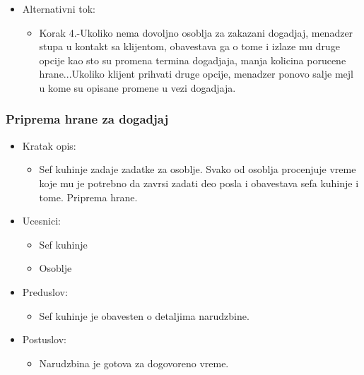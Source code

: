 \documentclass[a4paper]{article}
\begin{document}
      \begin{itemize}
        \item Alternativni tok:
          \begin{itemize}
        \item Korak 4.-Ukoliko nema dovoljno osoblja za zakazani dogadjaj, menadzer stupa u kontakt sa klijentom, obavestava ga o tome i izlaze mu druge opcije kao sto su promena termina dogadjaja, manja kolicina porucene hrane...Ukoliko klijent prihvati druge opcije, menadzer ponovo salje mejl u kome su opisane promene u vezi dogadjaja.
    \end{itemize}
    \end{itemize}
\subsubsection{Priprema hrane za dogadjaj}
\begin{itemize}
    \item Kratak opis:
    \begin{itemize}
        \item Sef kuhinje zadaje zadatke za osoblje. Svako od osoblja procenjuje vreme koje mu je potrebno da zavrsi zadati deo posla i obavestava sefa kuhinje i tome. Priprema hrane.
    \end{itemize}
\end{itemize}
  \begin{itemize}
        \item Ucesnici:
          \begin{itemize}
        \item Sef kuhinje
    \end{itemize}
      \begin{itemize}
        \item Osoblje
    \end{itemize}
    \end{itemize}
      \begin{itemize}
        \item Preduslov:
          \begin{itemize}
        \item Sef kuhinje je obavesten o detaljima narudzbine.
   \end{itemize}
    
    \end{itemize}
      \begin{itemize}
        \item Postuslov:
          \begin{itemize}
        \item Narudzbina je gotova za dogovoreno vreme.
    \end{itemize}
    \end{itemize}
\end{document}
